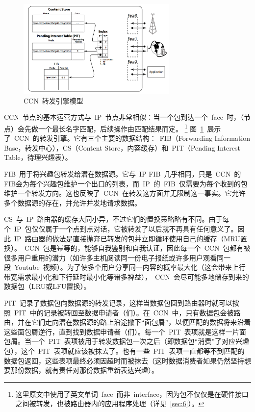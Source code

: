 \begin{figure}
  \centering
  \includegraphics[width=0.7\textwidth]{images/engine}
  \caption{CCN~转发引擎模型} 
  \label{engine}
\end{figure}

CCN~节点的基本运营方式与~IP~节点非常相似：当一个包到达一个~face~时，（节点）会先做一个最长名字匹配，后续操作由匹配结果而定。
\renewcommand\baselinestretch{1} %
\footnote{这里原文中使用了英文单词~face~而非~interface，因为包不仅仅是在硬件接口之间被转发，也被路由器内的应用程序处理（详见~\ref{sec:6}）。}
图~\ref{engine}~展示了~CCN~的转发引擎。它有三个主要的数据结构：~FIB（Forwarding Information Base，转发中心），CS（Content Store，内容缓存）和~PIT（Pending Interest Table，待理兴趣表）。

FIB~用于将兴趣包转发给潜在数据源。它与~IP FIB~几乎相同，只是~CCN~的FIB会为每个兴趣包维护一个出口的列表，而~IP~的~FIB~仅需要为每个收到的包维护一个转发方向。这也反映了~CCN~在转发这方面并无限制这一事实。它允许多个数据源的存在，并允许并发地请求数据。

CS~与~IP~路由器的缓存大同小异，不过它们的置换策略略有不同。由于每个~IP~包仅仅属于一个点到点对话，它被转发了以后就不再具有任何意义了。因此~IP~路由器的做法是直接抛弃已转发的包并立即循环使用自己的缓存（MRU置换）。~CCN~包是幂等的，能够自我鉴别和自我认证，因此每一个~CCN~包都有被很多用户重用的潜力（如许多主机阅读同一份电子报纸或许多用户观看同一段~Youtube~视频）。为了使多个用户分享同一内容的概率最大化（这会带来上行带宽需求最小化和下行延时最小化等诸多裨益），~CCN~会尽可能多地储存到来的数据包（LRU或LFU置换）。

PIT~记录了数据包向数据源的转发记录，这样当数据包回到路由器时就可以按照~PIT~中的记录被转回至数据申请者（们）。在~CCN~中，只有数据包会被路由，并在它们走向潜在数据源的路上沿途撒下“面包屑”，以便匹配的数据将来沿着这些面包屑逆行，直到找到数据申请者（们）。每一个~PIT~表项就是这样一片面包屑。当一个~PIT~表项被用于转发数据包一次之后（即数据包“消费”了对应兴趣包），这个~PIT~表项就应该被抹去了。也有一些~PIT~表项一直都等不到匹配的数据包返回，这些表项最终必须因超时而被抹去（这时数据消费者如果仍然坚持想要那份数据，就有责任对那份数据重新表达兴趣）。

